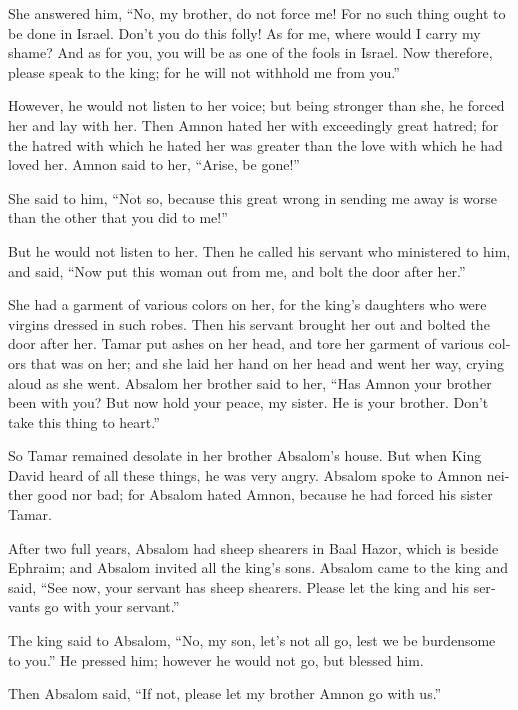 \begin{paracol}{2}
\begin{otherlanguage}{english}
 She answered him, ``No, my brother, do not force me! For
no such thing ought to be done in Israel. Don't you do this folly!
 As for me, where would I carry my shame? And as for you,
you will be as one of the fools in Israel. Now therefore, please speak
to the king; for he will not withhold me from you.''

 However, he would not listen to her voice; but being
stronger than she, he forced her and lay with her.  Then
Amnon hated her with exceedingly great hatred; for the hatred with which
he hated her was greater than the love with which he had loved her.
Amnon said to her, ``Arise, be gone!''

 She said to him, ``Not so, because this great wrong in
sending me away is worse than the other that you did to me!''

But he would not listen to her.  Then he called his
servant who ministered to him, and said, ``Now put this woman out from
me, and bolt the door after her.''

 She had a garment of various colors on her, for the
king's daughters who were virgins dressed in such robes. Then his
servant brought her out and bolted the door after her. 
Tamar put ashes on her head, and tore her garment of various colors that
was on her; and she laid her hand on her head and went her way, crying
aloud as she went.  Absalom her brother said to her,
``Has Amnon your brother been with you? But now hold your peace, my
sister. He is your brother. Don't take this thing to heart.''

So Tamar remained desolate in her brother Absalom's house.
 But when King David heard of all these things, he was
very angry.  Absalom spoke to Amnon neither good nor bad;
for Absalom hated Amnon, because he had forced his sister Tamar.

 After two full years, Absalom had sheep shearers in Baal
Hazor, which is beside Ephraim; and Absalom invited all the king's sons.
 Absalom came to the king and said, ``See now, your
servant has sheep shearers. Please let the king and his servants go with
your servant.''

 The king said to Absalom, ``No, my son, let's not all
go, lest we be burdensome to you.'' He pressed him; however he would not
go, but blessed him.

 Then Absalom said, ``If not, please let my brother Amnon
go with us.''


\end{otherlanguage}
\end{paracol}
